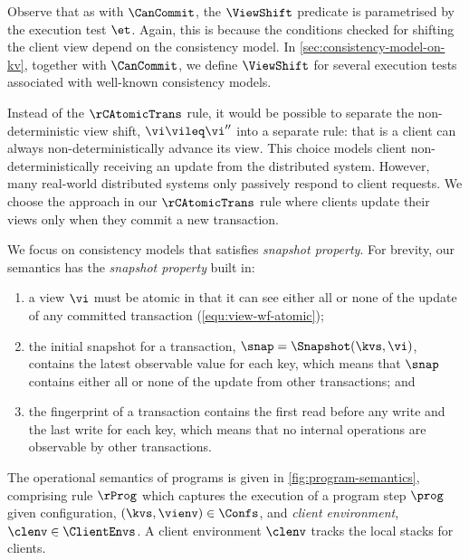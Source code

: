 

Observe that as with \(\CanCommit\), 
the \(\ViewShift\) predicate is parametrised by the execution test \(\et\). 
Again, this is because the conditions checked 
for shifting the client view depend on the consistency model. 
In \cref{sec:consistency-model-on-kv}, together with  \(\CanCommit\), 
we define \(\ViewShift\) for several execution tests 
associated with well-known consistency models.

Instead of the \(\rCAtomicTrans\) rule,
it would be possible to separate the non-deterministic view  shift, \(  \vi \vileq \vi'' \) into a separate rule: that is
a client can always non-deterministically advance its view.
This choice models client non-deterministically receiving an update from the distributed system.
However, many real-world distributed systems only passively respond to client requests.
We choose the approach in our \(\rCAtomicTrans\) rule where clients update their views only when they commit a new transaction.

We focus on consistency models that satisfies \emph{snapshot property}.
For brevity, our semantics has the \emph{snapshot property} built in:
\begin{enumerate}
    \item a view \( \vi \) must be atomic in that it can see either all or none of 
    the update of any committed transaction (\cref{equ:view-wf-atomic});
    \item the initial snapshot for a transaction, \( \snap = \Snapshot(\kvs,\vi) \), 
        contains the latest observable value for each key, 
        which means that \( \snap \) contains either all or none of the update from other transactions; and
    \item the fingerprint of a transaction contains the first read before any write 
        and the last write for each key, 
        which means that no internal operations are observable by other transactions.
\end{enumerate}



The operational semantics of programs is given in \cref{fig:program-semantics}, comprising rule \( \rProg\) which
captures the execution of a program step \( \prog \)
given configuration, \( (\kvs, \vienv ) \in \Confs \), and \emph{client environment}, \(\clenv \in \ClientEnvs\).
A client environment \( \clenv \) tracks the local stacks for clients.

